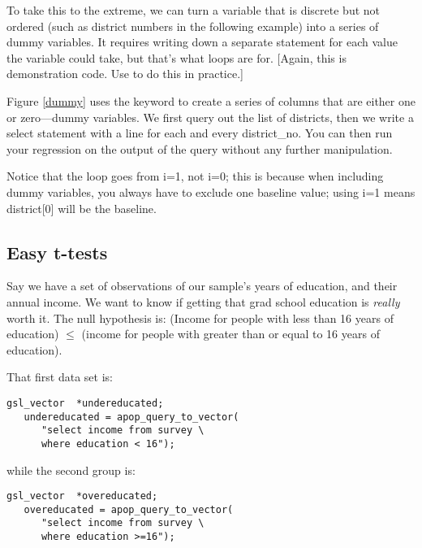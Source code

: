 
To take this to the extreme, we can turn a variable that is discrete
but not ordered (such as district numbers in the following example)
into a series of dummy variables. It requires writing down a separate
 statement for each value the variable could take, but
that's what  loops are for.  [Again, this is demonstration
code. Use  to do this in practice.]


Figure \ref{dummy} uses the  keyword to create a series of
columns that are either one or zero---dummy variables.  We first query
out the list of districts, then we write a select statement with a line
 for each and
every district\_no. You can then run your regression on the output of
the query without any further manipulation.

Notice that the  loop goes from i=1, not i=0; this is because when
including dummy variables, you always have to exclude one baseline
value; using i=1 means district[0] will be the baseline.

\subsection{Easy t-tests}
Say we have a set of observations of our sample's years of education,
and their annual income. We want to know if getting that grad school
education is {\it really} worth it. The null hypothesis is: (Income for
people with less than 16 years of education) $\leq$ (income for people
with greater than or equal to 16 years of education).

That first data set is:
\begin{lstlisting}
gsl_vector	*undereducated;
   undereducated = apop_query_to_vector(
      "select income from survey \
      where education < 16");
\end{lstlisting}
while the second group is:
\begin{lstlisting}
gsl_vector	*overeducated;
   overeducated = apop_query_to_vector(
      "select income from survey \
      where education >=16");
\end{lstlisting}


